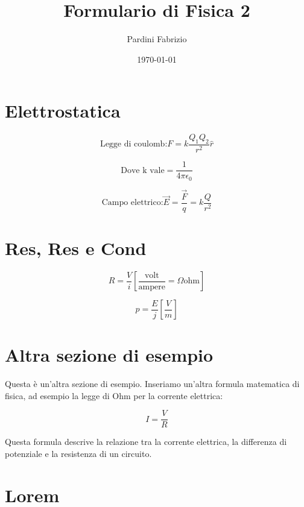 \documentclass[a4paper,11pt]{article}
\begin{document}
	
	\setlength{\abovedisplayskip}{0pt}
	\setlength{\belowdisplayskip}{0pt}
	
	\title{\Large\bfseries Formulario di Fisica 2\vspace{-1em}}
	\author{Pardini Fabrizio\vspace{-1cm}}
	\date{\today\vspace{-1em}}
	\maketitle
	
	\begin{multicols}{3}
		\setlength{\columnseprule}{0.03pt}
		\def\columnseprulecolor{\color{black}}
		
		\section{Elettrostatica}
		
		
		\begin{equation}
			\text{Legge di coulomb:}F=k\frac{Q_{1}Q_{2}}{r^{2}}\hat{r}
		\end{equation}
	
		\begin{equation}
			\text{Dove k vale}=\frac{1}{4\pi\epsilon_{0}}
		\end{equation}
	
		
		\begin{equation}
			\text{Campo elettrico:}\vec{E}=\frac{\vec{F}}{q}=k\frac{Q}{r^{2}}
		\end{equation}
	
	
		\section{Res, Res e Cond}
		
		\begin{equation}
			R=\frac{V}{i} \left[\frac{\text{volt}}{\text{ampere}}=\Omega\text{ohm}\right]
		\end{equation}
	
		\begin{equation}
			p=\frac{E}{j} \left[\frac{V}{m} \right]
		\end{equation}
		
		
		\section{Altra sezione di esempio}
		
		Questa è un'altra sezione di esempio. Inseriamo un'altra formula matematica di fisica, ad esempio la legge di Ohm per la corrente elettrica:
		
		\begin{equation}
			I=\frac{V}{R}
		\end{equation}
		
		Questa formula descrive la relazione tra la corrente elettrica, la differenza di potenziale e la resistenza di un circuito.
		
		
		\section{Lorem}
		\lipsum[1-20]
	\end{multicols}
	
\end{document}
